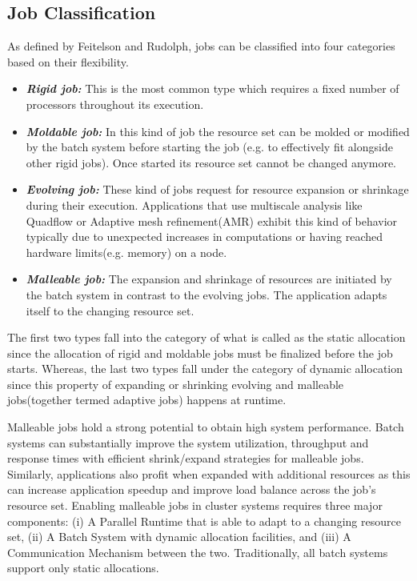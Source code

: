 \documentclass{acm_proc_article-sp}
\begin{document}
\subsection{Job Classification}
As defined by Feitelson and Rudolph\cite{rudolph}, jobs can be classified into four categories based on their flexibility.
\begin{itemize}
\item \textbf{\textit{Rigid job:}} This is the most common type which requires a fixed number of processors throughout its execution.
\item \textbf{\textit{Moldable job:}} In this kind of job the resource set can be molded or modified by the batch system before starting the job (e.g. to effectively fit alongside other rigid jobs). Once started its resource set cannot be changed anymore.
\item \textbf{\textit{Evolving job:}} These kind of jobs request for resource expansion or shrinkage during their execution. Applications that use multiscale analysis like Quadflow or Adaptive mesh refinement(AMR) exhibit this kind of behavior typically due to unexpected increases in computations or having reached hardware limits(e.g. memory) on a node.
\item \textbf{\textit{Malleable job:}} The expansion and shrinkage of resources are initiated by the batch system in contrast to the evolving jobs. The application adapts itself to the changing resource set.
\end{itemize}
The first two types fall into the category of what is called as the static allocation since the allocation of rigid and moldable jobs must be finalized before the job starts. Whereas, the last two types fall under the category of dynamic allocation since this property of expanding or shrinking evolving and malleable jobs(together termed adaptive jobs) happens at runtime.\par
\noindent
Malleable jobs\cite{gladys}\cite{travis} hold a strong potential to obtain high system performance. Batch systems can substantially improve the system utilization, throughput and response times with efficient shrink/expand strategies for malleable jobs. Similarly, applications also profit when expanded with additional resources as this can increase application speedup and improve load balance across the job{’}s resource set. Enabling malleable jobs in cluster systems requires three major components: (i) A Parallel Runtime that is able to adapt to a changing resource set, (ii) A Batch System with dynamic allocation facilities, and (iii) A Communication Mechanism between the two. Traditionally, all batch systems support only static allocations.\par
\end{document}
